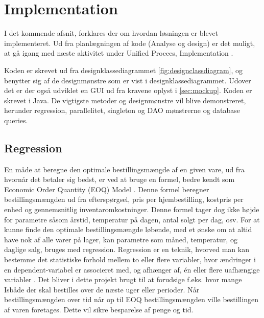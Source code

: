 \chapter{Implementation}\label{ch:implementation}
I det kommende afsnit, forklares der om hvordan løsningen er blevet implementeret. Ud fra planlægningen af kode (Analyse og design) er det muligt, at gå igang med næste aktivitet under Unified Procces, Implementation \cite{UnifiedProcess}. 

Koden er skrevet ud fra designklassediagrammet \ref{fig:designclassdiagram}, og benytter sig af de designmønstre som er vist i designklassediagrammet. Udover det er der også udviklet en GUI ud fra kravene oplyst i \ref{sec:mockup}. Koden er skrevet i Java. 
De vigtigste metoder og designmønstre vil blive demonstreret, herunder regression, parallelitet, singleton og DAO mønstrerne og database queries.

\section{Regression}
En måde at beregne den optimale bestillingsmængde af en given vare, ud fra hvornår det betaler sig bedst, er ved at bruge en formel, bedre kendt som Economic Order Quantity (EOQ) Model \cite{EOQ}. Denne formel beregner bestillingsmængden ud fra efterspørgsel, pris per hjembestilling, kostpris per enhed og gennemsnitlig inventaromkostninger. Denne formel tager dog ikke højde for parametre såsom årstid, temperatur på dagen, antal solgt per dag, osv. For at kunne finde den optimale bestillingsmængde løbende, med et ønske om at altid have nok af alle varer på lager, kan parametre som måned, temperatur, og daglige salg, bruges med regression. Regression er en teknik, hvorved man kan bestemme det statistiske forhold mellem to eller flere variabler, hvor ændringer i en dependent-variabel er associeret med, og afhænger af, én eller flere uafhængige variabler \cite{RegDef}. Det bliver i dette projekt brugt til at forudsige f.eks. hvor mange Isbåde \cite{Isbåd} der skal bestilles over de næste uger eller perioder. Når bestillingsmængden over tid når op til EOQ bestillingsmængden ville bestillingen af varen foretages. Dette vil sikre besparelse af penge og tid.


